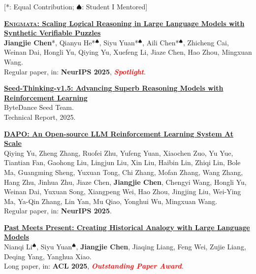 \documentclass{resume}
\begin{document}
[*: Equal Contribution; $\spadesuit$: Student I Mentored]
\begin{enumerate}[label={[\arabic*]}]
\setlength{\itemsep}{3pt}


  \item \textbf{\href{https://seed-enigmata.github.io}{\textsc{Enigmata}: Scaling Logical Reasoning in Large Language Models with Synthetic Verifiable Puzzles}}\\
  \label{paper:enigmata}
  \textbf{Jiangjie Chen}*, Qianyu He*$^\spadesuit$, Siyu Yuan*$^\spadesuit$, Aili Chen*$^\spadesuit$, Zhicheng Cai, Weinan Dai, Hongli Yu, Qiying Yu, Xuefeng Li, Jiaze Chen, Hao Zhou, Mingxuan Wang.\\
  Regular paper, in: \textbf{NeurIPS 2025}, \textcolor{red}{\textbf{\textit{Spotlight}}}.

  \item \textbf{\href{https://jiangjiechen.github.io/publication/seed_thinking_v1.5}{Seed-Thinking-v1.5: Advancing Superb Reasoning Models with Reinforcement Learning}}\\
  \label{paper:seed-thinking-v1.5}
  ByteDance Seed Team.\\
  Technical Report, 2025.

  \item \textbf{\href{https://jiangjiechen.github.io/publication/dapo}{DAPO: An Open-source LLM Reinforcement Learning System At Scale}}\\
  \label{paper:dapo}
  Qiying Yu, Zheng Zhang, Ruofei Zhu, Yufeng Yuan, Xiaochen Zuo, Yu Yue, Tiantian Fan, Gaohong Liu, Lingjun Liu, Xin Liu, Haibin Lin, Zhiqi Lin, Bole Ma, Guangming Sheng, Yuxuan Tong, Chi Zhang, Mofan Zhang, Wang Zhang, Hang Zhu, Jinhua Zhu, Jiaze Chen, \textbf{Jiangjie Chen}, Chengyi Wang, Hongli Yu, Weinan Dai, Yuxuan Song, Xiangpeng Wei, Hao Zhou, Jingjing Liu, Wei-Ying Ma, Ya-Qin Zhang, Lin Yan, Mu Qiao, Yonghui Wu, Mingxuan Wang.\\
  Regular paper, in: \textbf{NeurIPS 2025}.

  \item \textbf{\href{https://jiangjiechen.github.io/publication/historyanalogy}{Past Meets Present: Creating Historical Analogy with Large Language Models}}\\
  \label{paper:historyanalogy}
  Nianqi Li$^\spadesuit$, Siyu Yuan$^\spadesuit$, \textbf{Jiangjie Chen}, Jiaqing Liang, Feng Wei, Zujie Liang, Deqing Yang, Yanghua Xiao.\\
  Long paper, in: \textbf{ACL 2025}, \textcolor{red}{\textbf{\textit{Outstanding Paper Award}}}.


\end{enumerate}
\end{document}
